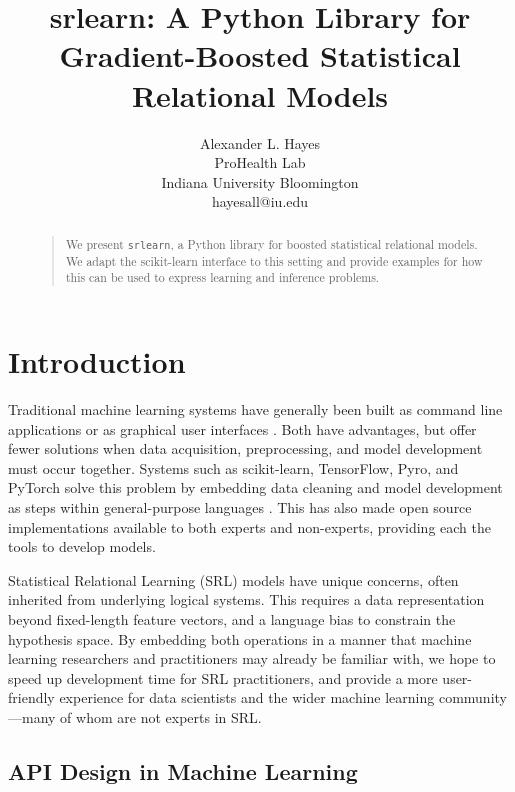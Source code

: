 \documentclass[letterpaper]{article}
\begin{document}
\title{srlearn: A Python Library for Gradient-Boosted Statistical Relational Models}
\author{Alexander L. Hayes\\
ProHealth Lab\\
Indiana University Bloomington\\
hayesall@iu.edu
}
\maketitle
\begin{abstract}
\begin{quote}
We present \texttt{srlearn}, a Python library for boosted statistical relational models.
We adapt the scikit-learn interface to this setting and
provide examples for how this can be used to express learning and inference
problems.
\end{quote}
\end{abstract}

\section{Introduction}

Traditional machine learning systems have generally been built as command line
applications or as graphical user interfaces \cite{hall2009weka}. Both have advantages,
but offer fewer solutions when data acquisition, preprocessing, and model
development must occur together. Systems such as scikit-learn,
TensorFlow, Pyro, and PyTorch solve
this problem by embedding data cleaning and model development as steps
within general-purpose languages
\cite{pedregosa2011scikit,abadi2016tensorflow,bingham2019pyro,paszke2017pytorch}.
This has also made open source implementations available to both experts
and non-experts, providing each the tools to develop models.

Statistical Relational Learning (SRL) models have unique concerns, often
inherited from underlying logical systems. This requires a
data representation beyond fixed-length feature vectors, and a language
bias to constrain the hypothesis space. By embedding both
operations in a manner that machine learning researchers and practitioners
may already be familiar with, we hope to speed up development time for SRL practitioners,
and provide a more user-friendly experience for data scientists and the wider machine
learning community---many of whom are not experts in SRL.

\subsection{API Design in Machine Learning}
\end{document}
